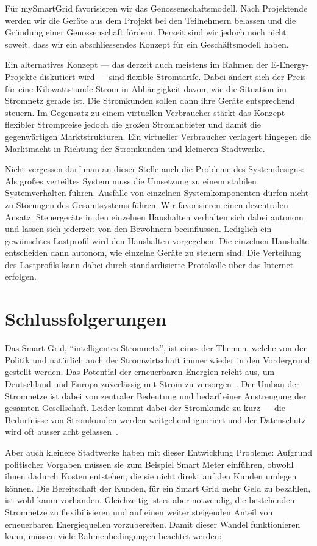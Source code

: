 \documentclass[logo]{fhgart}
\begin{document}
Für mySmartGrid favorisieren wir das Genossenschaftsmodell. Nach
Projektende werden wir die Geräte aus dem Projekt bei den Teilnehmern
belassen und die Gründung einer Genossenschaft fördern. Derzeit sind wir
jedoch noch nicht soweit, dass wir ein abschliessendes Konzept für ein
Geschäftsmodell haben.

Ein alternatives Konzept --- das derzeit auch meistens im Rahmen der
E-Energy-Projekte diskutiert wird --- sind flexible Stromtarife. Dabei
ändert sich der Preis für eine Kilowattstunde Strom in Abhängigkeit
davon, wie die Situation im Stromnetz gerade ist. Die Stromkunden sollen
dann ihre Geräte entsprechend steuern. Im Gegensatz zu einem virtuellen
Verbraucher stärkt das Konzept flexibler Strompreise jedoch die großen
Stromanbieter und damit die gegenwärtigen Marktstrukturen. Ein virtueller
Verbraucher verlagert hingegen die Marktmacht in Richtung der
Stromkunden und kleineren Stadtwerke.

Nicht vergessen darf man an dieser Stelle auch die Probleme des Systemdesigns:
Als großes verteiltes System muss die Umsetzung zu einem stabilen
Systemverhalten führen. Ausfälle von einzelnen Systemkomponenten dürfen
nicht zu Störungen des Gesamtsystems führen.  Wir favorisieren 
einen dezentralen Ansatz: Steuergeräte in den einzelnen Haushalten
verhalten sich dabei autonom und lassen sich jederzeit von den Bewohnern
beeinflussen. Lediglich ein gewünschtes Lastprofil wird
den Haushalten vorgegeben. Die einzelnen Haushalte entscheiden dann
autonom, wie einzelne Geräte zu steuern sind.  Die Verteilung des
Lastprofils kann dabei durch standardisierte Protokolle über das
Internet erfolgen.


\section{Schlussfolgerungen}
Das Smart Grid, "`intelligentes Stromnetz"', ist eines der Themen, welche
von der Politik und natürlich auch der Stromwirtschaft immer wieder in
den Vordergrund gestellt werden. Das Potential der erneuerbaren Energien
reicht aus, um Deutschland und Europa zuverlässig mit Strom zu
versorgen~\cite{sachverst10erneuerbar}. Der Umbau der Stromnetze ist
dabei von zentraler Bedeutung und bedarf einer Anstrengung der gesamten
Gesellschaft. Leider kommt dabei der Stromkunde zu
kurz --- die Bedürfnisse von Stromkunden werden weitgehend ignoriert und
der Datenschutz wird oft ausser acht gelassen~\cite{web:bmwinutzerschutz}.

Aber auch kleinere Stadtwerke haben mit dieser Entwicklung Probleme:
Aufgrund politischer Vorgaben müssen sie zum Beispiel Smart Meter
einführen, obwohl ihnen dadurch Kosten entstehen, die sie nicht direkt
auf den Kunden umlegen können. Die Bereitschaft der Kunden, für ein
Smart Grid mehr Geld zu bezahlen, ist wohl kaum vorhanden. Gleichzeitig
ist es aber notwendig, die bestehenden Stromnetze zu flexibilisieren und
auf einen weiter steigenden Anteil von erneuerbaren Energiequellen
vorzubereiten. Damit dieser Wandel funktionieren kann, müssen viele
Rahmenbedingungen beachtet werden:
\end{document}
